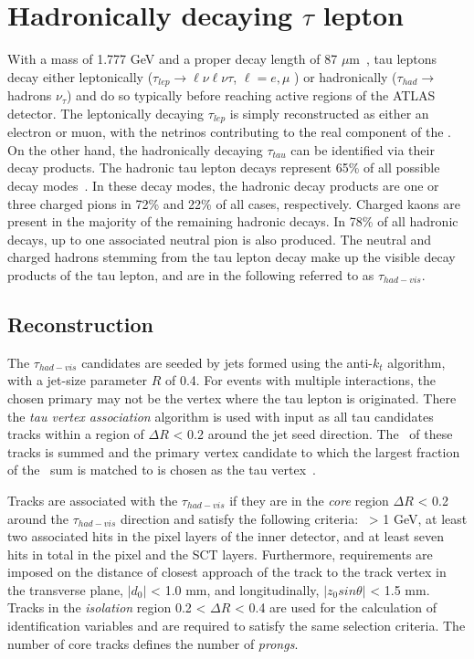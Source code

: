 \large

\section{Hadronically decaying $\tau$ lepton}
With a mass of 1.777 GeV and a proper decay length
of 87 $\mu$m~\cite{PDG}, tau leptons decay either leptonically
($\tau_{lep} \rightarrow \ell \nu \ell \nu \tau$, $\ell  = e, \mu$ ) 
or hadronically ($\tau_{had} \rightarrow$ hadrons $\nu_{\tau}$) 
and do so typically before reaching active
regions of the \hbox{ATLAS} detector. 
The leptonically decaying $\tau_{lep}$ is simply reconstructed
as either an electron or muon, with the netrinos contributing 
to the real component of the \met. 
On the other hand, the hadronically decaying $\tau_{tau}$ 
can be identified via their decay products. 
The hadronic tau lepton decays represent 65\% of all possible decay modes~\cite{PDG}. 
In these decay modes, the hadronic decay products are 
one or three charged pions in 72\% and 22\% of all cases, respectively. 
Charged kaons are present in the 
majority of the remaining hadronic decays. 
In 78\% of all hadronic decays, up to one associated neutral pion is
also produced. The neutral and charged hadrons stemming from 
the tau lepton decay make up the visible
decay products of the tau lepton, 
and are in the following referred to as $\tau_{had-vis}$.
\subsection{Reconstruction}
The $\tau_{had-vis}$ candidates are
seeded by jets formed using the anti-$k_t$ algorithm,
with a jet-size parameter $R$ of 0.4. 
For events with multiple interactions, the chosen primary may not be the
vertex where the tau lepton is originated. 
There the \textit{tau vertex association} algorithm is used with 
input as all tau candidates tracks within a region of $\Delta R$ < 0.2 
around the jet seed direction. 
The \pt\ of these tracks is summed and the 
primary vertex candidate to which the largest fraction
of the \pt\ sum is matched to is chosen as the tau vertex~\cite{ATLAS-CONF-2014-018}.

Tracks are associated with the $\tau_{had-vis}$ if they are
in the \textit{core} region $\Delta R$ < 0.2 
around the $\tau_{had-vis}$ direction and 
satisfy the following criteria: \pt\ > 1 GeV, 
at least two associated hits in the pixel layers of the inner detector, 
and at least seven hits in total in the pixel and the SCT layers. 
Furthermore, requirements are imposed on 
the distance of closest approach of the track to the track vertex
in the transverse plane, $|d_0|$ < 1.0 mm, and
longitudinally, $|z_0 sin\theta|$ < 1.5 mm. 
Tracks in the \textit{isolation} region 0.2 < $\Delta R$ < 0.4 
are used for the calculation of identification variables 
and are required to satisfy the same selection criteria.
The number of core tracks defines the number of \textit{prongs}.

